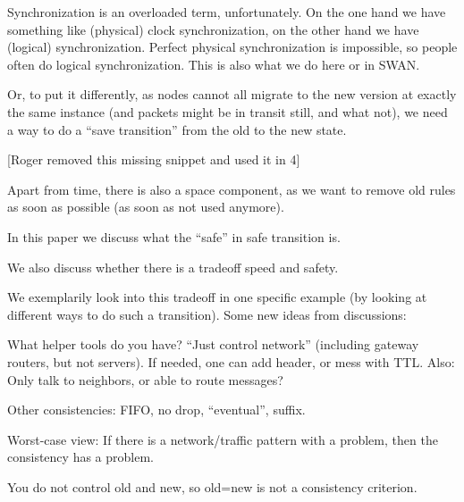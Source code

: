 Synchronization is an overloaded term, unfortunately. On the one hand we have something like (physical) clock synchronization, on the other hand we have (logical) synchronization. Perfect physical synchronization is impossible, so people often do logical synchronization. This is also what we do here or in SWAN.

Or, to put it differently, as nodes cannot all migrate to the new version at exactly the same instance (and packets might be in transit still, and what not), we need a way to do a ``save transition'' from the old to the new state.

[Roger removed this missing snippet and used it in 4]

Apart from time, there is also a space component, as we want to remove old rules as soon as possible (as soon as not used anymore).

In this paper we discuss what the ``safe'' in safe transition is.

We also discuss whether there is a tradeoff speed and safety.

We exemplarily look into this tradeoff in one specific example (by looking at different ways to do such a transition).
Some new ideas from discussions:

What helper tools do you have? ``Just control network'' (including gateway routers, but not servers). If needed, one can add header, or mess with TTL. Also: Only talk to neighbors, or able to route messages?

Other consistencies: FIFO, no drop, ``eventual'', suffix.

Worst-case view: If there is a network/traffic pattern with a problem, then the consistency has a problem.

You do not control old and new, so old=new is not a consistency criterion.


